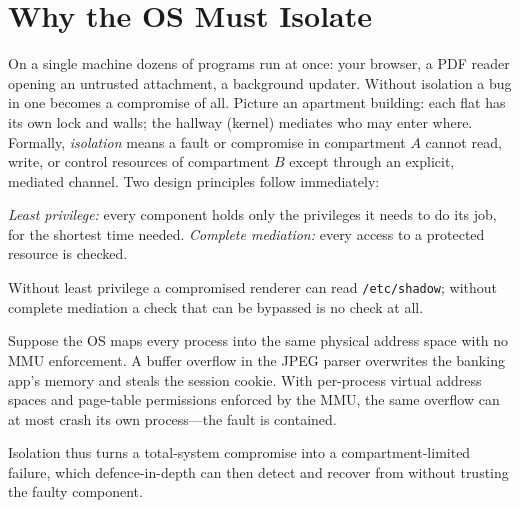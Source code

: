 \section{Why the OS Must Isolate}
\label{sec:os-why-isolate}
On a single machine dozens of programs run at once: your browser, a PDF reader opening an untrusted attachment, a background updater. Without isolation a bug in one becomes a compromise of all. Picture an apartment building: each flat has its own lock and walls; the hallway (kernel) mediates who may enter where.
Formally, \emph{isolation} means a fault or compromise in compartment $A$ cannot read, write, or control resources of compartment $B$ except through an explicit, mediated channel.
Two design principles follow immediately:
\begin{definition}
\emph{Least privilege:} every component holds only the privileges it needs to do its job, for the shortest time needed. \emph{Complete mediation:} every access to a protected resource is checked.
\end{definition}
Without least privilege a compromised renderer can read \texttt{/etc/shadow}; without complete mediation a check that can be bypassed is no check at all.
\begin{example}
Suppose the OS maps every process into the same physical address space with no MMU enforcement. A buffer overflow in the JPEG parser overwrites the banking app's memory and steals the session cookie. With per-process virtual address spaces and page-table permissions enforced by the MMU, the same overflow can at most crash its own process---the fault is contained.
\end{example}
Isolation thus turns a total-system compromise into a compartment-limited failure, which defence-in-depth can then detect and recover from without trusting the faulty component.
